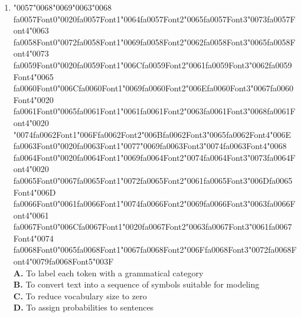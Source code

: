 \documentclass[11pt]{article}
\begin{document}
\begin{enumerate}[label=Q\arabic*., leftmargin=*]
\item {\char"0057}{\char"0068}{\char"0069}{\char"0063}{\char"0068} {\csname fa0057Font0\endcsname\char"0020}{\csname fa0057Font1\endcsname\char"0064}{\csname fa0057Font2\endcsname\char"0065}{\csname fa0057Font3\endcsname\char"0073}{\csname fa0057Font4\endcsname\char"0063} {\csname fa0058Font0\endcsname\char"0072}{\csname fa0058Font1\endcsname\char"0069}{\csname fa0058Font2\endcsname\char"0062}{\csname fa0058Font3\endcsname\char"0065}{\csname fa0058Font4\endcsname\char"0073} {\csname fa0059Font0\endcsname\char"0020}{\csname fa0059Font1\endcsname\char"006C}{\csname fa0059Font2\endcsname\char"0061}{\csname fa0059Font3\endcsname\char"0062}{\csname fa0059Font4\endcsname\char"0065} {\csname fa0060Font0\endcsname\char"006C}{\csname fa0060Font1\endcsname\char"0069}{\csname fa0060Font2\endcsname\char"006E}{\csname fa0060Font3\endcsname\char"0067}{\csname fa0060Font4\endcsname\char"0020} {\csname fa0061Font0\endcsname\char"0065}{\csname fa0061Font1\endcsname\char"0061}{\csname fa0061Font2\endcsname\char"0063}{\csname fa0061Font3\endcsname\char"0068}{\csname fa0061Font4\endcsname\char"0020} {\char"0074}{\csname fa0062Font1\endcsname\char"006F}{\csname fa0062Font2\endcsname\char"006B}{\csname fa0062Font3\endcsname\char"0065}{\csname fa0062Font4\endcsname\char"006E} {\csname fa0063Font0\endcsname\char"0020}{\csname fa0063Font1\endcsname\char"0077}{\char"0069}{\csname fa0063Font3\endcsname\char"0074}{\csname fa0063Font4\endcsname\char"0068} {\csname fa0064Font0\endcsname\char"0020}{\csname fa0064Font1\endcsname\char"0069}{\csname fa0064Font2\endcsname\char"0074}{\csname fa0064Font3\endcsname\char"0073}{\csname fa0064Font4\endcsname\char"0020} {\csname fa0065Font0\endcsname\char"0067}{\csname fa0065Font1\endcsname\char"0072}{\csname fa0065Font2\endcsname\char"0061}{\csname fa0065Font3\endcsname\char"006D}{\csname fa0065Font4\endcsname\char"006D} {\csname fa0066Font0\endcsname\char"0061}{\csname fa0066Font1\endcsname\char"0074}{\csname fa0066Font2\endcsname\char"0069}{\csname fa0066Font3\endcsname\char"0063}{\csname fa0066Font4\endcsname\char"0061} {\csname fa0067Font0\endcsname\char"006C}{\csname fa0067Font1\endcsname\char"0020}{\csname fa0067Font2\endcsname\char"0063}{\csname fa0067Font3\endcsname\char"0061}{\csname fa0067Font4\endcsname\char"0074} {\csname fa0068Font0\endcsname\char"0065}{\csname fa0068Font1\endcsname\char"0067}{\csname fa0068Font2\endcsname\char"006F}{\csname fa0068Font3\endcsname\char"0072}{\csname fa0068Font4\endcsname\char"0079}{\csname fa0068Font5\endcsname\char"003F}\\[0.25em]
\textbf{A.} To label each token with a grammatical category\\
\textbf{B.} To convert text into a sequence of symbols suitable for modeling\\
\textbf{C.} To reduce vocabulary size to zero\\
\textbf{D.} To assign probabilities to sentences


\end{enumerate}
\end{document}
